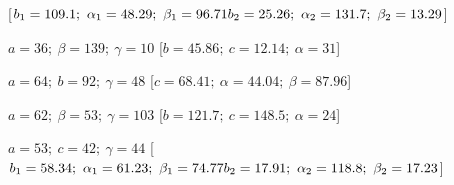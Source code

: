\begin{esercizio}
\begin{enumeratea}
   \hfill [\(b_1=109.1;~\alpha_1=48.29;~\beta_1=96.71 \\
   {} \hfill          b_2=25.26;~\alpha_2=131.7;~\beta_2=13.29\)]
  \item  \(a=36;~\beta=139;~\gamma=10\)
   \hfill [\(b=45.86;~c=12.14;~\alpha=31\)]
  \item  \(a=64;~b=92;~\gamma=48\)
   \hfill [\(c=68.41;~\alpha=44.04;~\beta=87.96\)]
  \item  \(a=62;~\beta=53;~\gamma=103\)
   \hfill [\(b=121.7;~c=148.5;~\alpha=24\)]
  \item  \(a=53;~c=42;~\gamma=44\)
   \hfill [\(b_1=58.34;~\alpha_1=61.23;~\beta_1=74.77 \\
   {} \hfill          b_2=17.91;~\alpha_2=118.8;~\beta_2=17.23\)]
 \end{enumeratea}
\end{esercizio}

